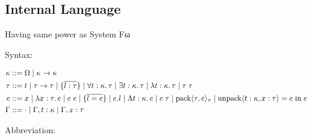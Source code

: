 \subsection{Internal Language}

Having same power as System Fω

Syntax:

\begin{align*}
  \kappa
  &\mathrel{::=} \Omega \mid \kappa \to \kappa
  \\
  \tau
  &\mathrel{::=} t
  \mid \tau \to \tau
  \mid \{\overline{l: \tau}\}
  \mid \forall t: \kappa\ldotp \tau
  \mid \exists t: \kappa\ldotp \tau
  \mid \lambda t: \kappa\ldotp \tau
  \mid \tau\; \tau
  \\
  e
  &\mathrel{::=} x
  \mid \lambda x: \tau\ldotp e
  \mid e\; e
  \mid \{\overline{l = e}\}
  \mid e . l
  \mid \Lambda t: \kappa\ldotp e
  \mid e\; \tau
  \mid \mathop{\mathrm{pack}} \langle \tau, e\rangle_\tau
  \mid \mathop{\mathrm{unpack}} \langle t: \kappa, x: \tau\rangle = e \mathrel{\mathrm{in}} e
  \\
  \Gamma
  &\mathrel{::=} \cdot
  \mid \Gamma, t: \kappa
  \mid \Gamma, x: \tau
\end{align*}

Abbreviation:

